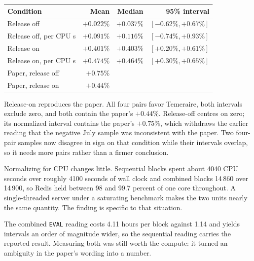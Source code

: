 \documentclass[a4paper,11pt]{article}
\begin{document}
\begin{center}
\begin{tabular}{@{}lrrr@{}}
\toprule
Condition & Mean & Median & 95\% interval \\
\midrule
Release off             & $+0.022\%$ & $+0.037\%$ & $[-0.62\%,+0.67\%]$ \\
Release off, per CPU s  & $+0.091\%$ & $+0.116\%$ & $[-0.74\%,+0.93\%]$ \\
Release on              & $+0.401\%$ & $+0.403\%$ & $[+0.20\%,+0.61\%]$ \\
Release on, per CPU s   & $+0.474\%$ & $+0.464\%$ & $[+0.30\%,+0.65\%]$ \\
\midrule
Paper, release off      & $+0.75\%$ & & \\
Paper, release on       & $+0.44\%$ & & \\
\bottomrule
\end{tabular}
\end{center}

Release-on reproduces the paper. All four pairs favor Temeraire, both intervals
exclude zero, and both contain the paper's $+0.44\%$. Release-off centres on
zero; its normalized interval contains the paper's $+0.75\%$, which withdraws the
earlier reading that the negative July sample was inconsistent with the paper.
Two four-pair samples now disagree in sign on that condition while their
intervals overlap, so it needs more pairs rather than a firmer conclusion.

Normalizing for CPU changes little. Sequential blocks spent about 4040 CPU
seconds over roughly 4100 seconds of wall clock and combined blocks 14\,860 over
14\,900, so Redis held between 98 and 99.7 percent of one core throughout. A
single-threaded server under a saturating benchmark makes the two units nearly
the same quantity. The finding is specific to that situation.

The combined \texttt{EVAL} reading costs 4.11 hours per block against 1.14 and
yields intervals an order of magnitude wider, so the sequential reading carries
the reported result. Measuring both was still worth the compute: it turned an
ambiguity in the paper's wording into a number.
\end{document}
